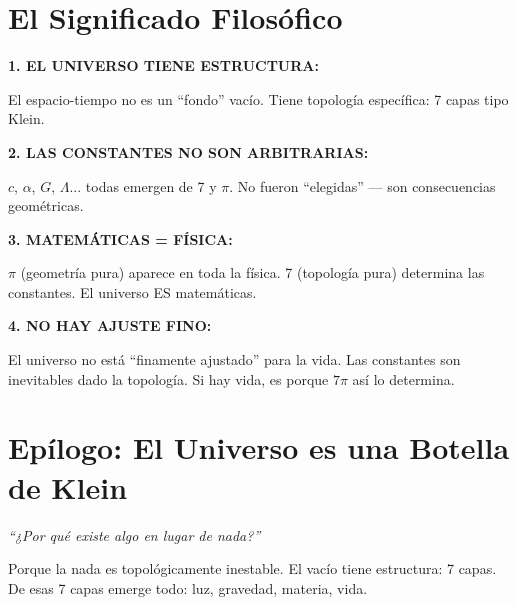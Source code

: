 \section{El Significado Filosófico}

\begin{tcolorbox}[colback=kleingray, colframe=kleinblue, title=\textbf{Implicaciones Profundas}]

\textbf{1. EL UNIVERSO TIENE ESTRUCTURA:}

El espacio-tiempo no es un ``fondo'' vacío.
Tiene topología específica: 7 capas tipo Klein.

\vspace{0.3cm}
\textbf{2. LAS CONSTANTES NO SON ARBITRARIAS:}

$c$, $\alpha$, $G$, $\Lambda$... todas emergen de 7 y $\pi$.
No fueron ``elegidas'' --- son consecuencias geométricas.

\vspace{0.3cm}
\textbf{3. MATEMÁTICAS = FÍSICA:}

$\pi$ (geometría pura) aparece en toda la física.
7 (topología pura) determina las constantes.
El universo ES matemáticas.

\vspace{0.3cm}
\textbf{4. NO HAY AJUSTE FINO:}

El universo no está ``finamente ajustado'' para la vida.
Las constantes son inevitables dado la topología.
Si hay vida, es porque $7\pi$ así lo determina.

\end{tcolorbox}


\section{Epílogo: El Universo es una Botella de Klein}

\begin{center}
\textit{``¿Por qué existe algo en lugar de nada?''}
\end{center}

Porque la nada es topológicamente inestable.
El vacío tiene estructura: 7 capas.
De esas 7 capas emerge todo: luz, gravedad, materia, vida.

